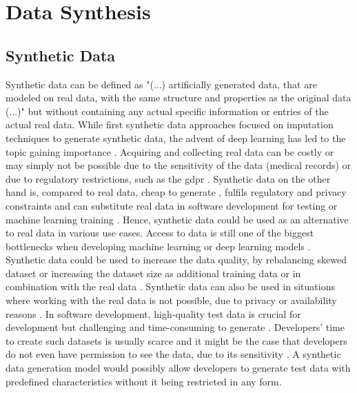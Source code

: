 \section{Data Synthesis}
\label{ch:preliminaries-dataSynthesis}

\subsection{Synthetic Data}
\label{ch:preliminaries-dataSynthesis-syntheticData}
Synthetic data can be defined as "(...) artificially generated data, that are modeled on real data, with the same structure and properties as the original data (...)" \cite[p. 2]{kaloskampis2020SyntheticDataCivil} 
but without containing any actual specific information or entries of the actual real data. 
While first synthetic data approaches \cite{gelman1992InferenceIterativeSimulation} focused on imputation techniques to generate synthetic data, the advent of deep learning has led to the topic gaining importance \cite{kowalczyk2022TaxonomyUseSynthetic, kaloskampis2020SyntheticDataCivil}.
Acquiring and collecting real data can be costly \cite{panova2022HowSyntheticData} or may simply not be possible due to the sensitivity of the data (\eg medical records) \cite{esteban2017RealvaluedMedicalTimea} or due to regulatory restrictions, such as the \gls{gdpr}  \cite{european_commission_regulation_2016}.
Synthetic data on the other hand is, compared to real data, cheap to generate \cite{leminh2021AirGenGANbasedSynthetica}, fulfils regulatory and privacy constraints \cite{zhao2022CTABGANEnhancingTabular} and can substitute real data in software development for testing \cite{whiting2008CreatingRealisticScenariobased} or machine learning training \cite{panova2022HowSyntheticData}.
Hence, synthetic data could be used as an alternative to real data in various use cases.
Access to data is still one of the biggest bottlenecks when developing machine learning or deep learning models \cite{fan2020RelationalDataSynthesisa}.
Synthetic data could be used to increase the data quality, by rebalancing skewed dataset \cite{zhao2022CTABGANEnhancingTabular} 
or increasing the dataset size as additional training data or in combination with the real data \cite{leminh2021AirGenGANbasedSynthetica, kim2021OCTGANNeuralODEbased}.
Synthetic data can also be used in situations where working with the real data is not possible, due to privacy or availability reasons \cite{9034117, whiting2008CreatingRealisticScenariobased}.
In software development, high-quality test data is crucial for development but challenging and time-consuming to generate \cite{whiting2008CreatingRealisticScenariobased}.
Developers' time to create such datasets is usually scarce and it might be the case that developers do not even have permission to see the data, due to its sensitivity \cite{whiting2008CreatingRealisticScenariobased}.
A synthetic data generation model would possibly allow developers to generate test data with predefined characteristics without it being restricted in any form.


